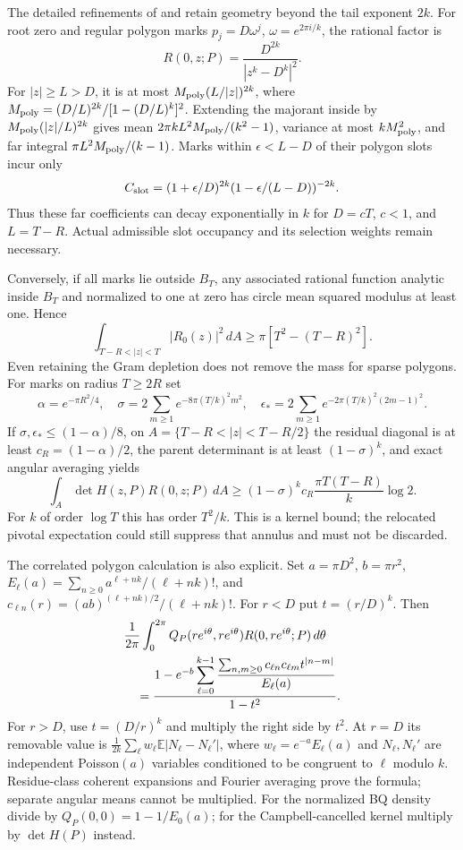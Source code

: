 \documentclass[11pt,a4paper]{article}
\theoremstyle{definition}
\theoremstyle{remark}
\numberwithin{equation}{section}
\begin{document}
The detailed refinements of
 and
 retain geometry beyond
the tail exponent $2k$. For root zero and regular polygon marks
$p_j=D\omega^j$, $\omega=e^{2\pi i/k}$, the rational factor is
\[
 R(0,z;P)=\frac{D^{2k}}{|z^k-D^k|^2}.
\]
For $|z|\ge L>D$, it is at most
$M_{\rm poly}(L/|z|)^{2k}$, where
$M_{\rm poly}=(D/L)^{2k}/[1-(D/L)^k]^2$.
Extending the majorant inside by
$M_{\rm poly}(|z|/L)^{2k}$ gives mean
$2\pi kL^2M_{\rm poly}/(k^2-1)$, variance at most
$kM_{\rm poly}^2$, and far integral
$\pi L^2M_{\rm poly}/(k-1)$.
Marks within $\epsilon<L-D$ of their polygon slots incur only
\[
 C_{\rm slot}=(1+\epsilon/D)^{2k}
                       (1-\epsilon/(L-D))^{-2k}.
\]
Thus these far coefficients can decay exponentially in $k$ for
$D=cT$, $c<1$, and $L=T-R$. Actual admissible slot occupancy
and its selection weights remain necessary.

Conversely, if all marks lie outside $B_T$, any associated rational
function analytic inside $B_T$ and normalized to one at zero has
circle mean squared modulus at least one. Hence
\[
 \int_{T-R<|z|<T}|R_0(z)|^2\,dA
                      \ge\pi[T^2-(T-R)^2].
\]
Even retaining the Gram depletion does not remove the mass for
sparse polygons. For marks on radius $T\ge2R$ set
\[
 \alpha=e^{-\pi R^2/4},\quad
 \sigma=2\sum_{m\ge1}e^{-8\pi(T/k)^2m^2},\quad
 \epsilon_*=2\sum_{m\ge1}e^{-2\pi(T/k)^2(2m-1)^2}.
\]
If $\sigma,\epsilon_*\le(1-\alpha)/8$, on
$A=\{T-R<|z|<T-R/2\}$ the residual diagonal is at least
$c_R=(1-\alpha)/2$, the parent determinant is at least
$(1-\sigma)^k$, and exact angular averaging yields
\begin{equation}\label{br:polygon-annulus}
 \int_A\det H(z,P)R(0,z;P)\,dA
 \ge(1-\sigma)^kc_R\frac{\pi T(T-R)}{k}\log2 .
\end{equation}
For $k$ of order $\log T$ this has order $T^2/k$.
This is a kernel bound; the relocated pivotal expectation could
still suppress that annulus and must not be discarded.

The correlated polygon calculation is also explicit. Set
$a=\pi D^2$, $b=\pi r^2$,
$E_\ell(a)=\sum_{n\ge0}a^{\ell+nk}/(\ell+nk)!$, and
$c_{\ell n}(r)=(ab)^{(\ell+nk)/2}/(\ell+nk)!$.
For $r<D$ put $t=(r/D)^k$. Then
\begin{align}
 &\frac1{2\pi}\int_0^{2\pi}
       Q_P(re^{i\theta},re^{i\theta})R(0,re^{i\theta};P)\,d\theta
 \notag\\
 &\quad=\frac{1-e^{-b}\displaystyle\sum_{\ell=0}^{k-1}
         \frac{\sum_{n,m\ge0}c_{\ell n}c_{\ell m}t^{|n-m|}}
              {E_\ell(a)}}{1-t^2}.
 \label{br:polygon-correlated}
\end{align}
For $r>D$, use $t=(D/r)^k$ and multiply the right side by $t^2$.
At $r=D$ its removable value is
$\frac1{2k}\sum_\ell w_\ell\mathbb E|N_\ell-N_\ell'|$,
where $w_\ell=e^{-a}E_\ell(a)$ and $N_\ell,N_\ell'$ are independent
Poisson$(a)$ variables conditioned to be congruent to $\ell$ modulo
$k$. Residue-class coherent expansions and Fourier averaging prove
the formula; separate angular means cannot be multiplied.
For the normalized BQ density divide by
$Q_P(0,0)=1-1/E_0(a)$; for the Campbell-cancelled kernel multiply
by $\det H(P)$ instead.
\end{document}
